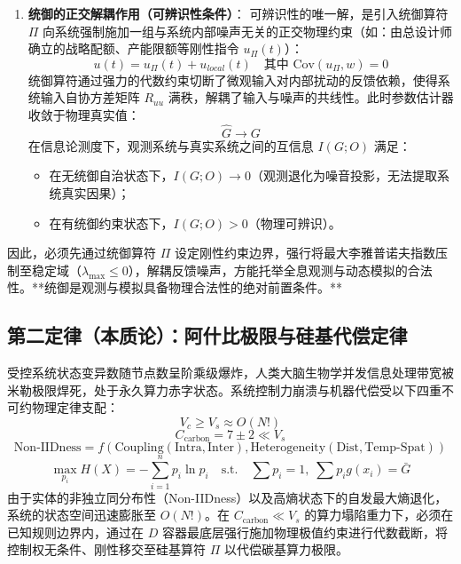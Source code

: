 \documentclass[11pt,a4paper]{article}
\begin{document}
\begin{enumerate}
    \item \textbf{统御的正交解耦作用（可辨识性条件）}：
    可辨识性的唯一解，是引入统御算符 $\Pi$ 向系统强制施加一组与系统内部噪声无关的正交物理约束（如：由总设计师确立的战略配额、产能限额等刚性指令 $u_{\Pi}(t)$）：
    \begin{equation}
        u(t) = u_{\Pi}(t) + u_{local}(t) \quad \text{其中 } \text{Cov}(u_{\Pi}, w) = 0
    \end{equation}
    统御算符通过强力的代数约束切断了微观输入对内部扰动的反馈依赖，使得系统输入自协方差矩阵 $R_{uu}$ 满秩，解耦了输入与噪声的共线性。此时参数估计器收敛于物理真实值：
    \begin{equation}
        \hat{G} \longrightarrow G
    \end{equation}
    在信息论测度下，观测系统与真实系统之间的互信息 $I(G; O)$ 满足：
    \begin{itemize}
        \item 在无统御自治状态下，$I(G; O) \to 0$（观测退化为噪音投影，无法提取系统真实因果）；
        \item 在有统御约束状态下，$I(G; O) > 0$（物理可辨识）。
    \end{itemize}
\end{enumerate}

因此，必须先通过统御算符 $\Pi$ 设定刚性约束边界，强行将最大李雅普诺夫指数压制至稳定域（$\lambda_{\text{max}} \le 0$），解耦反馈噪声，方能托举全息观测与动态模拟的合法性。**统御是观测与模拟具备物理合法性的绝对前置条件。**

\subsection*{第二定律（本质论）：阿什比极限与硅基代偿定律}
受控系统状态变异数随节点数呈阶乘级爆炸，人类大脑生物学并发信息处理带宽被米勒极限焊死，处于永久算力赤字状态。系统控制力崩溃与机器代偿受以下四重不可约物理定律支配：
\begin{equation}
    V_c \ge V_s \approx O(N!)
\end{equation}
\begin{equation}
    C_{\text{carbon}} = 7 \pm 2 \ll V_s
\end{equation}
\begin{equation}
    \text{Non-IIDness} = f\left(\text{Coupling}(\text{Intra}, \text{Inter}), \text{Heterogeneity}(\text{Dist}, \text{Temp-Spat})\right)
\end{equation}
\begin{equation}
    \max_{p_i} H(X) = -\sum_{i=1}^{n} p_i \ln p_i \quad \text{s.t.} \quad \sum p_i = 1, \; \sum p_i g(x_i) = \bar{G}
\end{equation}
由于实体的非独立同分布性（Non-IIDness）以及高熵状态下的自发最大熵退化，系统的状态空间迅速膨胀至 $O(N!)$。在 $C_{\text{carbon}} \ll V_s$ 的算力塌陷重力下，必须在已知规则边界内，通过在 $D$ 容器最底层强行施加物理极值约束进行代数截断，将控制权无条件、刚性移交至硅基算符 $\Pi$ 以代偿碳基算力极限。
\end{document}
